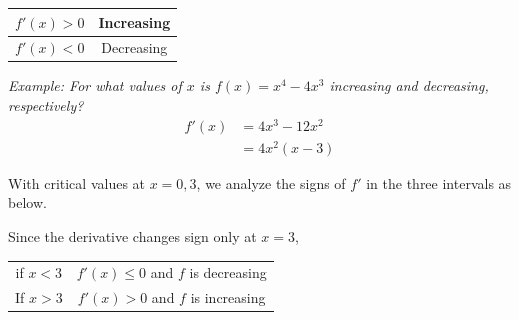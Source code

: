 \documentclass{article}
\begin{document}
            \begin{center}
                \begin{tabular}{|c|c|}
                    \hline
                    $f'(x)>0$ & Increasing \\
                    \hline
                    $f'(x)<0$ & Decreasing \\
                    \hline
                \end{tabular}
            \end{center}

            \noindent \color{blue} \textit{Example: For what values of $x$ is $f(x)=x^4-4x^3$
            increasing and decreasing, respectively?} \color{black} \\

            \begin{align*}
                f'(x) &= 4x^3 -12x^2 \\
                &= 4x^2(x-3)
            \end{align*}

            \noindent With critical values at $x=0,3$, we analyze the signs of $f'$ in the three
            intervals as below. \\

            \begin{center}
            \end{center}

            \nonindent Since the derivative changes sign only at $x=3$,\\

            \begin{center}
                \begin{tabular}{cc}
                    if $x<3$ & $f'(x)\leq 0$ and $f$ is decreasing \\
                    If $x>3$ & $f'(x)> 0$ and $f$ is increasing
                \end{tabular}
            \end{center}
\end{document}
